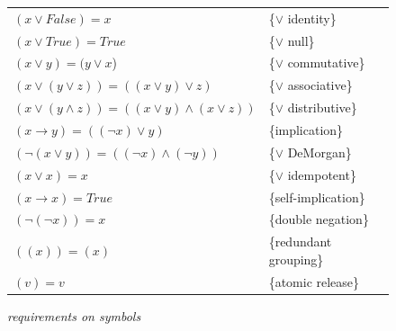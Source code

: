 \begin{figure}
\begin{center}
\begin{tabular}{ll}
$(x \vee False) = x$                                     & \{$\vee$ identity\} \\
$(x \vee True) = True$                                   & \{$\vee$ null\} \\
$(x \vee y) = (y \vee x$)                                & \{$\vee$ commutative\} \\
$(x \vee (y \vee z)) = ((x \vee y) \vee z)$              & \{$\vee$ associative\} \\
$(x \vee (y \wedge z)) = ((x \vee y) \wedge (x \vee z))$ & \{$\vee$ distributive\} \\
$(x \rightarrow y) = ((\neg x) \vee y)$                  & \{implication\} \\
$(\neg(x \vee y)) = ((\neg x) \wedge (\neg y))$          & \{$\vee$ DeMorgan\} \\
$(x \vee x) = x$                                         & \{$\vee$ idempotent\} \\
$(x \rightarrow x) = True$                               & \{self-implication\} \\
$(\neg(\neg x))  = x$                                    & \{double negation\} \\
$((x)) = (x)$                                            & \{redundant grouping\} \\
$(v) = v$                                                & \{atomic release\} \\
\end{tabular}

\vspace{2 mm}

\emph{requirements on symbols}


\end{center}
\end{figure}
